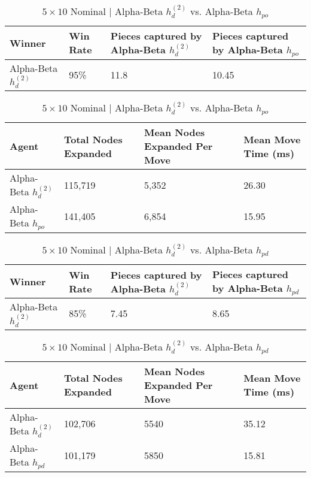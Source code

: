 \documentclass{article}[12pt]
\begin{document}
\begin{table}[ht]
	\centering
	\begin{tabular}{l | l | l | l}
		\hline
		Winner & Win Rate & Pieces captured by Alpha-Beta $h_{d}^{(2)}$ & Pieces captured by Alpha-Beta $h_{po}$ \\
		\hline \hline 
		Alpha-Beta $h_{d}^{(2)}$  & 95\% & 11.8 & 10.45 \\
		\hline
	\end{tabular}
	
	\vspace{10px}
	
	\begin{tabular}{l | l | l | l}
		\hline
		Agent & Total Nodes Expanded & Mean Nodes Expanded Per Move & Mean Move Time (ms) \\
		\hline \hline 
		Alpha-Beta $h_{d}^{(2)}$  & 115,719& 5,352& 26.30 \\
		Alpha-Beta $h_{po}$ & 141,405 & 6,854 & 15.95\\
		\hline
	\end{tabular}
	\caption{$5 \times 10$ Nominal | Alpha-Beta $h_{d}^{(2)}$ vs. Alpha-Beta $h_{po}$} \label{tab:t23}
\end{table}

\begin{table}[ht]
	\centering
	\begin{tabular}{l | l | l | l}
		\hline
		Winner & Win Rate & Pieces captured by Alpha-Beta $h_{d}^{(2)}$ & Pieces captured by Alpha-Beta $h_{pd}$ \\
		\hline \hline 
		Alpha-Beta $h_{d}^{(2)}$ & 85\% & 7.45 & 8.65 \\
		\hline
	\end{tabular}
	
	\vspace{10px}
	
	\begin{tabular}{l | l | l | l}
		\hline
		Agent & Total Nodes Expanded & Mean Nodes Expanded Per Move & Mean Move Time (ms) \\
		\hline \hline 
		Alpha-Beta $h_{d}^{(2)}$  & 102,706 & 5540 & 35.12 \\
		Alpha-Beta $h_{pd}$ & 101,179 & 5850 & 15.81\\
		\hline
	\end{tabular}
	\caption{$5 \times 10$ Nominal | Alpha-Beta $h_{d}^{(2)}$ vs. Alpha-Beta $h_{pd}$} \label{tab:t25}
\end{table}
\end{document}
